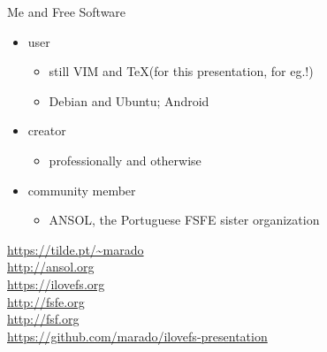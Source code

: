 \documentclass[landscape]{slides}
\begin{document}
\begin{slide}
Me and Free Software
  \begin{itemize}
    \item{} user
      \begin{itemize}
          \item{} still VIM and \TeX (for this presentation, for eg.!)
          \item{} Debian and Ubuntu; Android
      \end{itemize}
    \item{} creator
      \begin{itemize}
        \item{} professionally and otherwise
      \end{itemize}
    \item{} community member
      \begin{itemize}
        \item{} ANSOL, the Portuguese FSFE sister organization
      \end{itemize}
  \end{itemize}
\end{slide}





\begin{slide}

\url{https://tilde.pt/~marado} \\
\url{http://ansol.org} \\
\url{https://ilovefs.org} \\
\url{http://fsfe.org} \\
\url{http://fsf.org} \\
\url{https://github.com/marado/ilovefs-presentation}
\end{slide}
\end{document}
